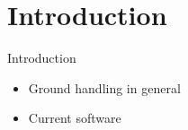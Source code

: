 \section{Introduction}
\begin{frame}{Introduction}{}
	\begin{itemize}
		\item Ground handling in general
		\item Current software
	\end{itemize}
\end{frame}